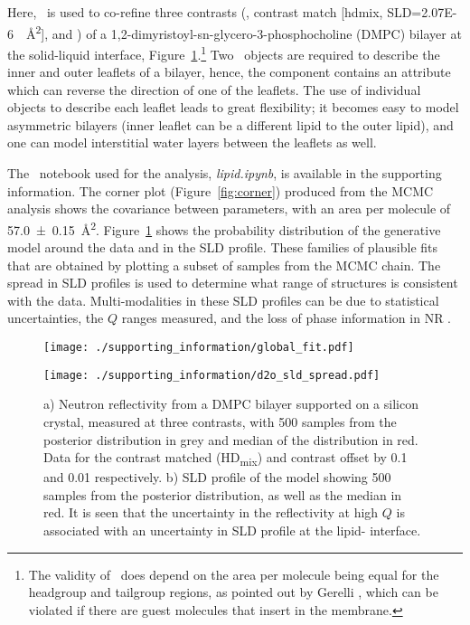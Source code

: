 \documentclass[pdf,preprint]{article}
\begin{document}
Here, \LipidLeaflet\ is used to co-refine three contrasts (,  contrast match [hdmix, SLD=\SI{2.07E-6}{\per\square\angstrom}], and ) of a 1,2-dimyristoyl-sn-glycero-3-phospho\-choline (DMPC) bilayer at the solid-liquid interface, Figure~\ref{fig:global_fit}.\footnote{The validity of \LipidLeaflet\ does depend on the area per molecule being equal for the headgroup and tailgroup regions, as pointed out by Gerelli \cite{Gerelli2016}, which can be violated if there are guest molecules that insert in the membrane.} Two \LipidLeaflet\ objects are required to describe the inner and outer leaflets of a bilayer, hence, the component contains an attribute which can reverse the direction of one of the leaflets. The use of individual objects to describe each leaflet leads to great flexibility; it becomes easy to model asymmetric bilayers (inner leaflet can be a different lipid to the outer lipid), and one can model interstitial water layers between the leaflets as well.

The \Jupyter\ notebook used for the analysis, \emph{lipid.ipynb}, is available in the supporting information. The corner plot (Figure~\ref{fig:corner}) produced from the MCMC analysis shows the covariance between parameters, with an area per molecule of \SI{57.0 \pm0.15}{\square\angstrom}. Figure~\ref{fig:global_fit} shows the probability distribution of the generative model around the data and in the SLD profile. These families of plausible fits that are obtained by plotting a subset of samples from the MCMC chain. The spread in SLD profiles is used to determine what range of structures is consistent with the data. Multi-modalities in these SLD profiles can be due to statistical uncertainties, the $Q$ ranges measured, and the loss of phase information in NR \cite{Majkrzak1999, Heinrich2009}.

\begin{figure}
\centering
\label{fig:global_fit}%
\texttt{[image: ./supporting\_information/global\_fit.pdf]}%


\texttt{[image: ./supporting\_information/d2o\_sld\_spread.pdf]}

\caption{a) Neutron reflectivity from a DMPC bilayer supported on a silicon crystal, measured at three contrasts, with 500 samples from the posterior distribution in grey and median of the distribution in red. Data for the contrast matched (HD\textsubscript{mix}) and  contrast offset by 0.1 and 0.01 respectively. b) SLD profile of the  model showing 500 samples from the posterior distribution, as well as the median in red. It is seen that the uncertainty in the reflectivity at high $Q$ is associated with an uncertainty in SLD profile at the lipid- interface.}
\end{figure}
\end{document}

